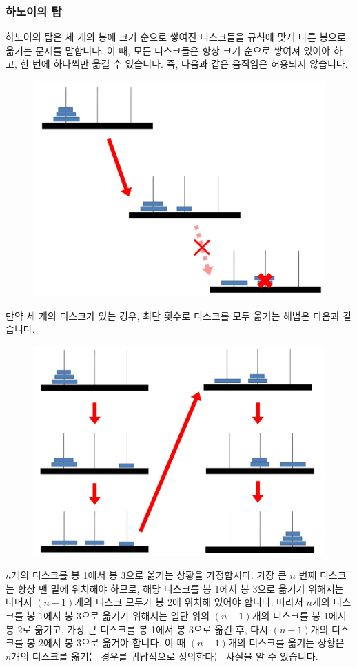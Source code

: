 \documentclass[../main.tex]{subfiles}
\begin{document}
\subsubsection{하노이의 탑}
하노이의 탑은 세 개의 봉에 크기 순으로 쌓여진 디스크들을 규칙에 맞게 다른 봉으로 옮기는 문제를 말합니다.
이 때, 모든 디스크들은 항상 크기 순으로 쌓여져 있어야 하고, 한 번에 하나씩만 옮길 수 있습니다.
즉, 다음과 같은 움직임은 허용되지 않습니다.

\begin{figure}[H]
\centering
\includegraphics[width=0.7\linewidth]{"./lectures/lecture8_hanoi_rule"}
\label{fig:lecture8hanoirule}
\end{figure}

만약 세 개의 디스크가 있는 경우, 최단 횟수로 디스크를 모두 옮기는 해법은 다음과 같습니다.

\begin{figure}[H]
\centering
\includegraphics[width=0.7\linewidth]{"./lectures/lecture8_hanoi_3"}
\label{fig:lecture8hanoi3}
\end{figure}

$n$개의 디스크를 봉 1에서 봉 3으로 옮기는 상황을 가정합시다.
가장 큰 $n$ 번째 디스크는 항상 맨 밑에 위치해야 하므로, 해당 디스크를 봉 1에서 봉 3으로 옮기기 위해서는 나머지 $(n - 1)$개의 디스크 모두가 봉 2에 위치해 있어야 합니다.
따라서 $n$개의 디스크를 봉 1에서 봉 3으로 옮기기 위해서는 일단 위의 $(n - 1)$개의 디스크를 봉 1에서 봉 2로 옮기고, 가장 큰 디스크를 봉 1에서 봉 3으로 옮긴 후, 다시 $(n - 1)$개의 디스크를 봉 2에서 봉 3으로 옮겨야 합니다.
이 때 $(n - 1)$개의 디스크를 옮기는 상황은 $n$개의 디스크를 옮기는 경우를 귀납적으로 정의한다는 사실을 알 수 있습니다.
\end{document}
